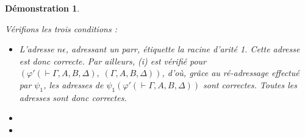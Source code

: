 \documentclass[11pt,a4paper]{article}
\newtheorem{demonstration}{Démonstration}
\newcommand*{\encode}{\ensuremath{\varphi}}
\begin{document}
\begin{demonstration}
\begin{itemize}
    Vérifions les trois conditions :
    \begin{itemize}
        \item[(i) :]{L'adresse $n \epsilon$, adressant un parr, étiquette la racine d'arité 1. Cette adresse est donc correcte. Par ailleurs, (i) est vérifié pour $\left( \encode ' \left( \vdash \Gamma, A, B, \Delta \right), \; \left( \Gamma, A, B, \Delta \right) \right)$, d'où, grâce au ré-adressage effectué par $\psi_1$, les adresses de $\psi_1 \left( \encode' \left( \vdash \Gamma, A, B, \Delta \right) \right)$ sont correctes. Toutes les adresses sont donc correctes.
        }
        
        \item[(ii) :]
        \item[(iii) :]
    \end{itemize}

    \end{itemize}

    
\end{demonstration}
\end{document}
